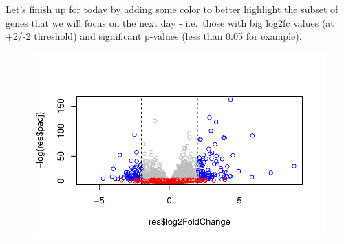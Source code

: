 \documentclass[
  letterpaper,
  DIV=11,
  numbers=noendperiod]{scrartcl}
\newenvironment{Shaded}{\begin{snugshade}}{\end{snugshade}}
\newcommand{\AttributeTok}[1]{\textcolor[rgb]{0.40,0.45,0.13}{#1}}
\newcommand{\DecValTok}[1]{\textcolor[rgb]{0.68,0.00,0.00}{#1}}
\newcommand{\FloatTok}[1]{\textcolor[rgb]{0.68,0.00,0.00}{#1}}
\newcommand{\FunctionTok}[1]{\textcolor[rgb]{0.28,0.35,0.67}{#1}}
\newcommand{\NormalTok}[1]{\textcolor[rgb]{0.00,0.23,0.31}{#1}}
\newcommand{\OtherTok}[1]{\textcolor[rgb]{0.00,0.23,0.31}{#1}}
\newcommand{\SpecialCharTok}[1]{\textcolor[rgb]{0.37,0.37,0.37}{#1}}
\newcommand{\StringTok}[1]{\textcolor[rgb]{0.13,0.47,0.30}{#1}}
\begin{document}
Let's finish up for today by adding some color to better highlight the
subset of genes that we will focus on the next day - i.e.~those with big
log2fc values (at +2/-2 threshold) and significant p-values (less than
0.05 for example).

\begin{Shaded}
\end{Shaded}

\begin{Shaded}
\end{Shaded}

\begin{figure}[H]

{\centering \includegraphics{class12_files/figure-pdf/unnamed-chunk-38-1.pdf}

}

\end{figure}
\end{document}
